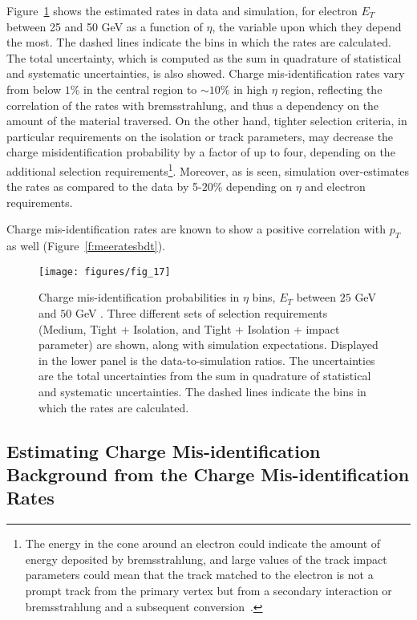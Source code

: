 Figure~\ref{f:meerates} \cite{atlaselcid} shows the estimated rates in data and
simulation, for electron $E_T$ between 25 and 50 GeV as a function of $\eta$, the
variable upon which they depend the most. The dashed lines indicate the bins
in which the rates are calculated. The total uncertainty, which is computed as
the sum in quadrature of statistical and systematic uncertainties, is also
showed. Charge mis-identification rates vary from below $1\%$ in the central
region to $\sim 10\%$ in high $\eta$ region, reflecting the correlation of the
rates with bremsstrahlung, and thus a dependency on the amount of the material
traversed. On the other hand, tighter selection criteria, in particular
requirements on the isolation or track parameters, may decrease the charge
misidentification probability by a factor of up to four, depending on the
additional selection requirements\footnote{The energy in the cone around an
electron could indicate the amount of energy deposited by bremsstrahlung, and
large values of the track impact parameters could mean that the track matched
to the electron is not a prompt track from the primary vertex but from a
secondary interaction or bremsstrahlung and a subsequent
conversion~\cite{atlaselcid}.}. Moreover, as is seen, simulation over-estimates
the rates as compared to the data by 5-$20\%$ depending on $\eta$ and electron
requirements.

Charge mis-identification rates are known to show a positive correlation with 
$p_T$ as well (Figure~\ref{f:meeratesbdt}).

\begin{figure}[H]
	\texttt{[image: figures/fig\_17]}
	\centering

	\caption{Charge mis-identification probabilities in $\eta$ bins, $E_T$ between
		$25$ GeV and $50$ GeV \cite{atlaselcid}. Three different sets of selection
		requirements (Medium, Tight + Isolation, and Tight + Isolation + impact
		parameter) are shown, along with simulation expectations. Displayed in the
		lower panel is the data-to-simulation ratios. The uncertainties are the total
		uncertainties from the sum in quadrature of statistical and systematic
		uncertainties. The dashed lines indicate the bins in which the rates are
		calculated.}

	\label{f:meerates}
\end{figure}



\subsection{Estimating Charge Mis-identification Background from the Charge
	Mis-identification Rates}


